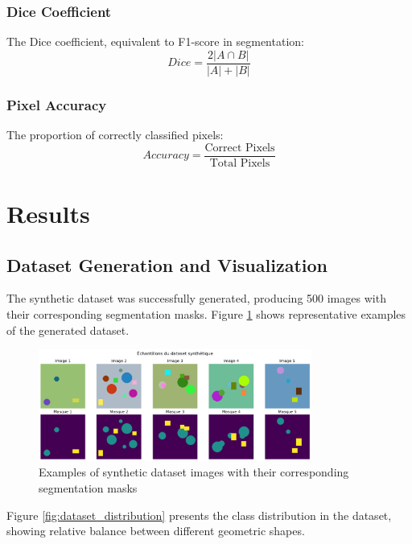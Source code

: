 \documentclass[12pt,a4paper]{article}
\begin{document}
\subsubsection{Dice Coefficient}

The Dice coefficient, equivalent to F1-score in segmentation:
\begin{equation}
Dice = \frac{2|A \cap B|}{|A| + |B|}
\end{equation}

\subsubsection{Pixel Accuracy}

The proportion of correctly classified pixels:
\begin{equation}
Accuracy = \frac{\text{Correct Pixels}}{\text{Total Pixels}}
\end{equation}

\section{Results}

\subsection{Dataset Generation and Visualization}

The synthetic dataset was successfully generated, producing 500 images with their corresponding segmentation masks. Figure \ref{fig:dataset_examples} shows representative examples of the generated dataset.

\begin{figure}[H]
    \centering
    \includegraphics[width=0.8\textwidth]{img_tp1/cell_07_output_02_image_01.png}
    \caption{Examples of synthetic dataset images with their corresponding segmentation masks}
    \label{fig:dataset_examples}
\end{figure}

Figure \ref{fig:dataset_distribution} presents the class distribution in the dataset, showing relative balance between different geometric shapes.
\end{document}

